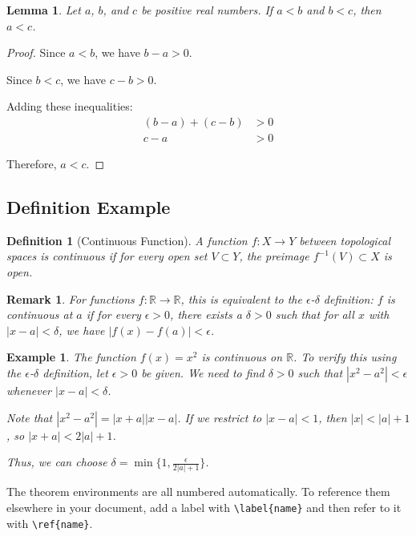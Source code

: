 \documentclass[11pt,a4paper]{article}
\newtheorem{lemma}[theorem]{Lemma}
\newtheorem{definition}{Definition}[section]
\newtheorem{example}{Example}[section]
\newtheorem{remark}{Remark}[section]
\newcommand{\R}{\mathbb{R}}         %
\begin{document}
\begin{lemma}
    Let $a$, $b$, and $c$ be positive real numbers. If $a < b$ and $b < c$, then $a < c$.
\end{lemma}

\begin{proof}
    Since $a < b$, we have $b - a > 0$.
    
    Since $b < c$, we have $c - b > 0$.
    
    Adding these inequalities:
    \begin{align}
        (b - a) + (c - b) &> 0 \\
        c - a &> 0
    \end{align}
    
    Therefore, $a < c$.
\end{proof}

\subsection{Definition Example}

\begin{definition}[Continuous Function]
    A function $f: X \to Y$ between topological spaces is continuous if for every open set $V \subset Y$, the preimage $f^{-1}(V) \subset X$ is open.
\end{definition}

\begin{remark}
    For functions $f: \R \to \R$, this is equivalent to the $\epsilon$-$\delta$ definition: $f$ is continuous at $a$ if for every $\epsilon > 0$, there exists a $\delta > 0$ such that for all $x$ with $|x - a| < \delta$, we have $|f(x) - f(a)| < \epsilon$.
\end{remark}

\begin{example}
    The function $f(x) = x^2$ is continuous on $\R$. To verify this using the $\epsilon$-$\delta$ definition, let $\epsilon > 0$ be given. We need to find $\delta > 0$ such that $|x^2 - a^2| < \epsilon$ whenever $|x - a| < \delta$.
    
    Note that $|x^2 - a^2| = |x + a||x - a|$. If we restrict to $|x - a| < 1$, then $|x| < |a| + 1$, so $|x + a| < 2|a| + 1$.
    
    Thus, we can choose $\delta = \min\{1, \frac{\epsilon}{2|a| + 1}\}$.
\end{example}

\begin{tipbox}
The theorem environments are all numbered automatically. To reference them elsewhere in your document, add a label with \verb|\label{name}| and then refer to it with \verb|\ref{name}|.
\end{tipbox}
\end{document}
